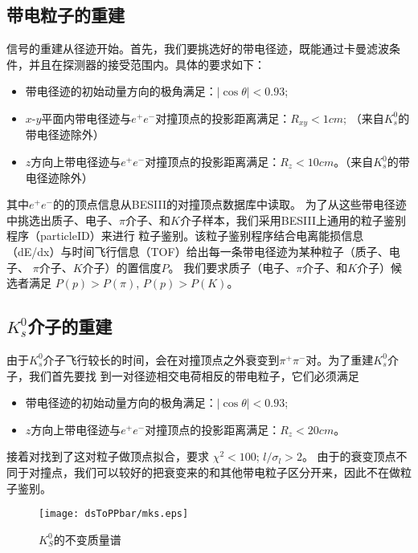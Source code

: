 \subsection{带电粒子的重建}%
\label{sec:charged-track}
信号的重建从径迹开始。首先，我们要挑选好的带电径迹，既能通过卡曼滤波条件，并且在探测器的接受范围内。具体的要求如下：
\begin{itemize}
    \item 
带电径迹的初始动量方向的极角满足：$|\cos \theta | < 0.93$;
    \item 
$x$-$y$平面内带电径迹与$e^{+}e^{-}$对撞顶点的投影距离满足：$R_{xy} < 1 cm$; （来自$K_{s}^{0}$的带电径迹除外）
    \item 
$z$方向上带电径迹与$e^{+}e^{-}$对撞顶点的投影距离满足：$R_{z} < 10 cm$。（来自$K_{s}^{0}$的带电径迹除外）
\end{itemize}
其中$e^{+}e^{-}$的的顶点信息从BESIII的对撞顶点数据库中读取。
为了从这些带电径迹中挑选出质子、电子、$\pi$介子、和$K$介子样本，我们采用BESIII上通用的粒子鉴别程序（particleID）来进行
粒子鉴别。该粒子鉴别程序结合电离能损信息（dE/dx）与时间飞行信息（TOF）给出每一条带电径迹为某种粒子（质子、电子、
$\pi$介子、$K$介子）的置信度$P$。
我们要求质子（电子、$\pi$介子、和$K$介子）候选者满足
$P(p) > P(\pi)$, $P(p) > P(K)$。
\subsection{$K_{s}^{0}$介子的重建}
由于$K_{s}^{0}$介子飞行较长的时间，会在对撞顶点之外衰变到$\pi^{+} \pi^{-}$对。为了重建$K_{s}^{0}$介子，我们首先要找
到一对径迹相交电荷相反的带电粒子，它们必须满足
\begin{itemize}
    \item 
带电径迹的初始动量方向的极角满足：$|\cos \theta | < 0.93$;
    \item 
$z$方向上带电径迹与$e^{+}e^{-}$对撞顶点的投影距离满足：$R_{z} < 20 cm$。
\end{itemize}

接着对找到了这对粒子做顶点拟合，要求
$\chi^{2} < 100$;
$ l / \sigma_{l} > 2$。
由于的衰变顶点不同于对撞点，我们可以较好的把衰变来的和其他带电粒子区分开来，因此不在做粒子鉴别。
\begin{figure}[htpb]
    \centering
    \texttt{[image: dsToPPbar/mks.eps]}
    \caption{$K_{S}^{0}$的不变质量谱}\label{fig:mks}
\end{figure}
